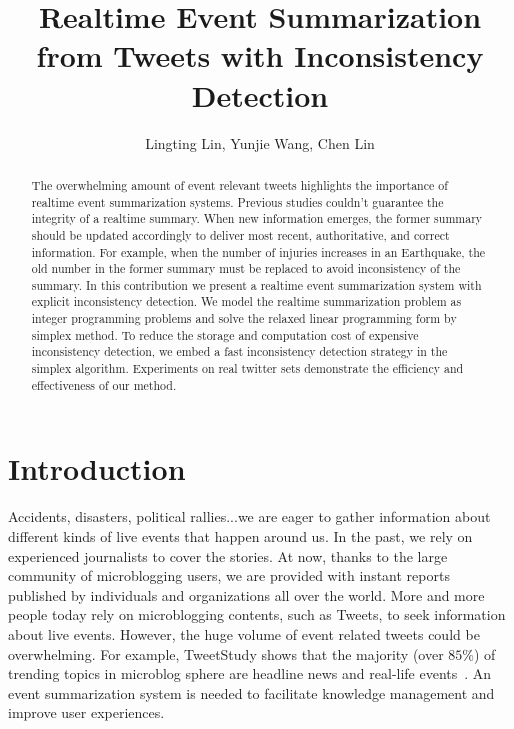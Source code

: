 \documentclass[envcountsame]{llncs}
\begin{document}
\title{Realtime Event Summarization from Tweets with Inconsistency Detection}
\author{Lingting Lin, Yunjie Wang, Chen Lin}

\maketitle
\begin{abstract}
The overwhelming amount of event relevant tweets highlights the importance of realtime event summarization systems. Previous studies couldn't guarantee the integrity of a realtime summary. When new information emerges, the former summary should be updated accordingly to deliver most recent, authoritative, and correct information. For example, when the number of injuries increases in an Earthquake, the old number in the former summary must be replaced to avoid inconsistency of the summary. In this contribution we present a realtime event summarization system with explicit inconsistency detection. We model the realtime summarization problem as integer programming problems and solve the relaxed linear programming form by simplex method. To reduce the storage and computation cost of expensive inconsistency detection, we embed a fast inconsistency detection strategy in the simplex algorithm. Experiments on real twitter sets demonstrate the efficiency and effectiveness of our method.
\end{abstract}

\section{Introduction}
Accidents, disasters, political rallies...we are eager to gather information about different kinds of live events that happen around us. In the past, we rely on experienced journalists to cover the stories. At now, thanks to the large community of microblogging users, we are provided with instant reports published by individuals and organizations all over the world.  More and more people today rely on microblogging contents, such as Tweets, to seek information about live events. However, the huge volume of event related tweets could be overwhelming. For example, TweetStudy shows that the majority (over $85\%$) of trending topics in microblog sphere are headline news and real-life events~\cite{kwak2010twitter}. An event summarization system is needed to facilitate knowledge management and improve user experiences.
\end{document}

